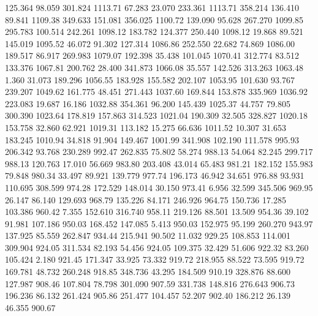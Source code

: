  125.364   98.059  301.824      1113.71
  67.283   23.070  233.361      1113.71
 358.214  136.410   89.841      1109.38
 349.633  151.081  356.025      1100.72
 139.090   95.628  267.270      1099.85
 295.783  100.514  242.261      1098.12
 183.782  124.377  250.440      1098.12
  19.868   89.521  145.019      1095.52
  46.072   91.302  127.314      1086.86
 252.550   22.682   74.869      1086.00
 189.517   86.917  269.983      1079.07
 192.398   35.438  101.045      1070.41
 312.774   83.512  133.376      1067.81
 200.762   28.400  341.873      1066.08
  35.557  142.526  313.263      1063.48
   1.360   31.073  189.296      1056.55
 183.928  155.582  202.107      1053.95
 101.630   93.767  239.207      1049.62
 161.775   48.451  271.443      1037.60
 169.844  153.878  335.969      1036.92
 223.083   19.687   16.186      1032.88
 354.361   96.200  145.439      1025.37
  44.757   79.805  300.390      1023.64
 178.819  157.863  314.523      1021.04
 190.309   32.505  328.827      1020.18
 153.758   32.860   62.921      1019.31
 113.182   15.275   66.636      1011.52
  10.307   31.653  183.245      1010.94
  34.818   91.904  149.467      1001.99
 341.908  102.190  111.578       995.93
 206.342   93.768  230.289       992.47
 262.835   75.802   58.274       988.13
  54.064   82.245  299.717       988.13
 120.763   17.010   56.669       983.80
 203.408   43.014   65.483       981.21
 182.152  155.983   79.848       980.34
  33.497   89.921  139.779       977.74
 196.173   46.942   34.651       976.88
  93.931  110.695  308.599       974.28
 172.529  148.014   30.150       973.41
   6.956   32.599  345.506       969.95
  26.147   86.140  129.693       968.79
 135.226   84.171  246.926       964.75
 150.736   17.285  103.386       960.42
   7.355  152.610  316.740       958.11
 219.126   88.501   13.509       954.36
  39.102   91.981  107.186       950.03
 168.452  147.085    5.413       950.03
 152.975   95.199  260.270       943.97
 137.925   85.559  262.847       934.44
 215.941   90.502   11.032       929.25
 108.853  114.001  309.904       924.05
 311.534   82.193   54.456       924.05
 109.375   32.429   51.606       922.32
  83.260  105.424    2.180       921.45
 171.347   33.925   73.332       919.72
 218.955   88.522   73.595       919.72
 169.781   48.732  260.248       918.85
 348.736   43.295  184.509       910.19
 328.876   88.600  127.987       908.46
 107.804   78.798  301.090       907.59
 331.738  148.816  276.643       906.73
 196.236   86.132  261.424       905.86
 251.477  104.457   52.207       902.40
 186.212   26.139   46.355       900.67
